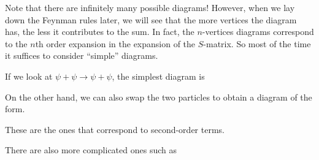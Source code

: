 \documentclass[a4paper]{article}
\begin{document}
Note that there are infinitely many possible diagrams! However, when we lay down the Feynman rules later, we will see that the more vertices the diagram has, the less it contributes to the sum. In fact, the $n$-vertices diagrams correspond to the $n$th order expansion in the expansion of the $S$-matrix. So most of the time it suffices to consider ``simple'' diagrams.

\begin{eg}
  If we look at $\psi + \psi \to \psi + \psi$, the simplest diagram is
  \begin{center}
  \end{center}
  On the other hand, we can also swap the two particles to obtain a diagram of the form.
  \begin{center}
  \end{center}
  These are the ones that correspond to second-order terms.

  There are also more complicated ones such as
  \begin{center}
\end{center}
\end{eg}
\end{document}
